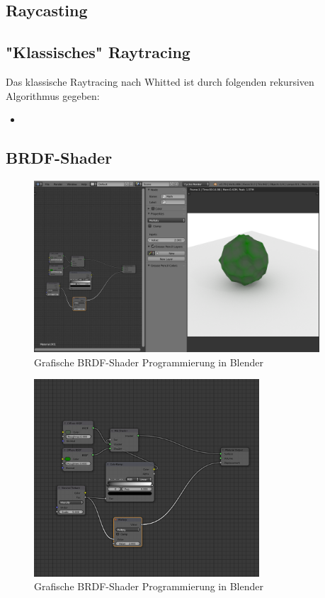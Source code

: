  
\subsection{Raycasting}
\subsection{"Klassisches" Raytracing}
Das klassische Raytracing nach Whitted ist durch folgenden rekursiven Algorithmus gegeben:
\begin{itemize}
\item 
\end{itemize}

\subsection{BRDF-Shader}
 \begin{figure}[H]
    \centering
    \includegraphics[width=0.95\textwidth]{images/blender_noodle.png}
    \caption{Grafische BRDF-Shader Programmierung in Blender}
    \label{fig:diffus}
\end{figure}
 \begin{figure}[H]
    \centering
    \includegraphics[width=0.75\textwidth]{images/blender_noodle2.png}
    \caption{Grafische BRDF-Shader Programmierung in Blender}
    \label{fig:diffus}
\end{figure}

